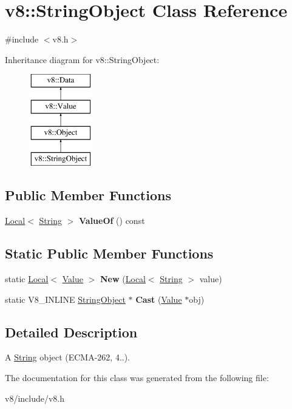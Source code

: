 \hypertarget{classv8_1_1StringObject}{}\section{v8\+:\+:String\+Object Class Reference}
\label{classv8_1_1StringObject}


{\ttfamily \#include $<$v8.\+h$>$}

Inheritance diagram for v8\+:\+:String\+Object\+:\begin{figure}[H]
\begin{center}
\leavevmode
\includegraphics[height=4.000000cm]{classv8_1_1StringObject}
\end{center}
\end{figure}
\subsection*{Public Member Functions}
\begin{DoxyCompactItemize}
\item 
\mbox{\label{classv8_1_1StringObject_a728454fbe6e41dc3af72de0f72ffe371}} 
\mbox{\hyperlink{classv8_1_1Local}{Local}}$<$ \mbox{\hyperlink{classv8_1_1String}{String}} $>$ {\bfseries Value\+Of} () const
\end{DoxyCompactItemize}
\subsection*{Static Public Member Functions}
\begin{DoxyCompactItemize}
\item 
\mbox{\label{classv8_1_1StringObject_af343f21a3437b3aab91a7aba5b0a1952}} 
static \mbox{\hyperlink{classv8_1_1Local}{Local}}$<$ \mbox{\hyperlink{classv8_1_1Value}{Value}} $>$ {\bfseries New} (\mbox{\hyperlink{classv8_1_1Local}{Local}}$<$ \mbox{\hyperlink{classv8_1_1String}{String}} $>$ value)
\item 
\mbox{\label{classv8_1_1StringObject_af01249353a4a9032f7791a6e7a4ff094}} 
static V8\+\_\+\+I\+N\+L\+I\+NE \mbox{\hyperlink{classv8_1_1StringObject}{String\+Object}} $\ast$ {\bfseries Cast} (\mbox{\hyperlink{classv8_1_1Value}{Value}} $\ast$obj)
\end{DoxyCompactItemize}


\subsection{Detailed Description}
A \mbox{\hyperlink{classv8_1_1String}{String}} object (E\+C\+M\+A-\/262, 4..). 

The documentation for this class was generated from the following file\+:\begin{DoxyCompactItemize}
\item 
v8/include/v8.\+h\end{DoxyCompactItemize}
